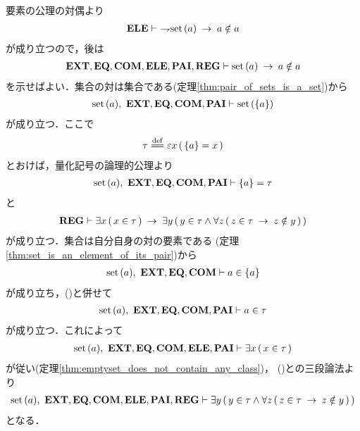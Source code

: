 	\begin{sketch}
		要素の公理の対偶より
		\begin{align}
			\mbox{{\bf ELE}} \vdash\ \rightharpoondown\hspace{-0.25em} \operatorname*{set}\hspace{0.15em}(a) \hspace{0.25em}\rightarrow\hspace{0.25em} a \notin a
		\end{align}
		が成り立つので，後は
		\begin{align}
			\mbox{{\bf EXT}},\mbox{{\bf EQ}},\mbox{\bf COM},\mbox{{\bf ELE}},\mbox{{\bf PAI}},\mbox{{\bf REG}} 
			\vdash \operatorname*{set}\hspace{0.15em}(a) \hspace{0.25em}\rightarrow\hspace{0.25em} a \notin a
		\end{align}
		を示せばよい．集合の対は集合である(定理\ref{thm:pair_of_sets_is_a_set})から
		\begin{align}
			\operatorname*{set}\hspace{0.15em}(a),\ \mbox{{\bf EXT}},\mbox{{\bf EQ}},\mbox{\bf COM},\mbox{{\bf PAI}} \vdash \operatorname*{set}\hspace{0.15em}(\{a\})
		\end{align}
		が成り立つ．ここで
		\begin{align}
			\tau \defeq \varepsilon x\, (\, \{a\} = x\, )
		\end{align}
		とおけば，量化記号の論理的公理より
		\begin{align}
			\operatorname*{set}\hspace{0.15em}(a),\ \mbox{{\bf EXT}},\mbox{{\bf EQ}},\mbox{\bf COM},\mbox{{\bf PAI}} \vdash \{a\} = \tau
			\label{fom:no_class_contains_itself_1}
		\end{align}
		と
		\begin{align}
			\mbox{{\bf REG}} \vdash \exists x\, (\, x \in \tau\, )
			\hspace{0.25em}\rightarrow\hspace{0.25em} \exists y\, (\, y \in \tau \wedge \forall z\, (\, 
			z \in \tau \hspace{0.25em}\rightarrow\hspace{0.25em} z \notin y\, )\, )
			\label{fom:no_class_contains_itself_2}
		\end{align}
		が成り立つ．集合は自分自身の対の要素である
		(定理\ref{thm:set_is_an_element_of_its_pair})から
		\begin{align}
			\operatorname*{set}\hspace{0.15em}(a),\ \mbox{{\bf EXT}},\mbox{{\bf EQ}},\mbox{\bf COM} \vdash a \in \{a\}
			\label{fom:no_class_contains_itself_3}
		\end{align}
		が成り立ち，()と併せて
		\begin{align}
			\operatorname*{set}\hspace{0.15em}(a),\ \mbox{{\bf EXT}},\mbox{{\bf EQ}},\mbox{\bf COM},\mbox{{\bf PAI}} \vdash a \in \tau
		\end{align}
		が成り立つ．これによって
		\begin{align}
			\operatorname*{set}\hspace{0.15em}(a),\ \mbox{{\bf EXT}},\mbox{{\bf EQ}},\mbox{\bf COM},\mbox{{\bf ELE}},\mbox{{\bf PAI}} \vdash 
			\exists x\, (\, x \in \tau\, )
		\end{align}
		が従い(定理\ref{thm:emptyset_does_not_contain_any_class})，
		()との三段論法より
		\begin{align}
			\operatorname*{set}\hspace{0.15em}(a),\ \mbox{{\bf EXT}},\mbox{{\bf EQ}},\mbox{\bf COM},\mbox{{\bf ELE}},\mbox{{\bf PAI}},\mbox{{\bf REG}} \vdash
			\exists y\, (\, y \in \tau \wedge \forall z\, (\, 
			z \in \tau \hspace{0.25em}\rightarrow\hspace{0.25em} z \notin y\, )\, )
		\end{align}
		となる．
		\begin{align}

\end{align}
\end{sketch}
